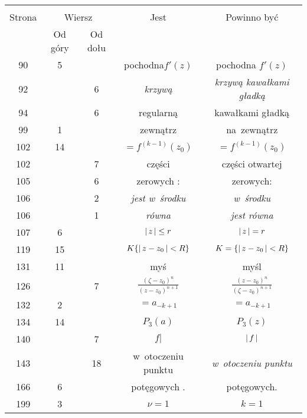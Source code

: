 \documentclass[a4paper,11pt]{article}
\begin{document}
\begin{center}
  \begin{tabular}{|c|c|c|c|c|}
    \hline
    & \multicolumn{2}{c|}{} & & \\
    Strona & \multicolumn{2}{c|}{Wiersz} & Jest
                              & Powinno być \\ \cline{2-3}
    & Od góry & Od dołu & & \\
    \hline
    90  &  5 & & pochodna$f'( z )$ & pochodna $f'( z )$ \\
    92  & &  6 & \emph{krzywą} & \emph{krzywą kawałkami gładką} \\
    94  & &  6 & regularną & kawałkami gładką \\
    99  &  1 & & zewnątrz & na~zewnątrz \\
    102 & 14 & & $=\!\! f^{ ( k - 1 ) }( z_{ 0 } )$
           & $= f^{ ( k - 1 ) }( z_{ 0 } )$ \\
    102 & &  7 & części & części otwartej \\
    105 & &  6 & zerowych : & zerowych: \\
    106 & &  2 & \emph{jest w~środku} & \emph{w~środku} \\
    106 & &  1 & \emph{równa} & \emph{jest równa} \\
    107 &  6 & & $\left| \,  z  \, \right| \leq r$ & $\left| \,  z  \, \right| = r$ \\
    119 & 15 & & $K \{ \left| \,  z - z_{ 0 }  \, \right| < R \}$
           & $K = \{ \left| \,  z - z_{ 0 }  \, \right| < R \}$ \\
    131 & 11 & & myś & myśl \\
    126 & &  7 & $\frac{ ( \zeta - z_{ 0 } )^{ n } }{
                 ( z - z_{ 0 } )^{ n + 1 } }$
           & $\frac{ ( z - z_{ 0 } )^{ n } }{
             ( \zeta - z_{ 0 } )^{ n + 1 } }$ \\
    132 &  2 & & $=\!\! a_{ -k + 1 }$ & $= a_{ -k + 1 }$ \\
    134 & 14 & & $P_{ 3 }( a )$ & $P_{ 3 }( z )$ \\
    140 & &  7 & $f |$ & $\left| \,  f  \, \right|$ \\
    143 & & 18 & w~otoczeniu punktu & \emph{w~otoczeniu punktu} \\
    166 &  6 & & potęgowych . & potęgowych. \\
    199 &  3 & & $\nu = 1 $ & $k = 1$ \\
    \hline
  \end{tabular}
\end{center}
\end{document}
